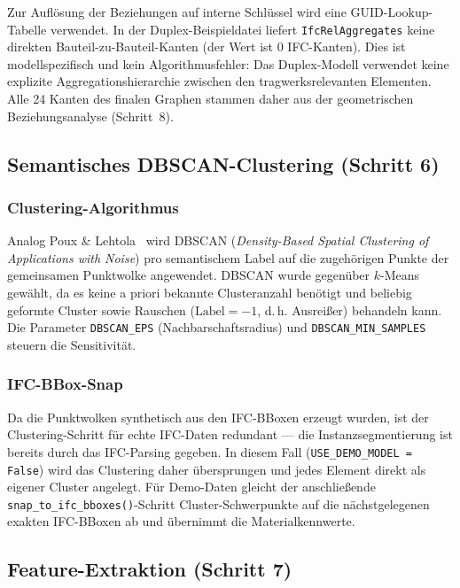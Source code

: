 \documentclass[a4paper,11pt]{article}
\begin{document}
Zur Auflösung der Beziehungen auf interne Schlüssel wird eine GUID-Lookup-Tabelle verwendet. In der Duplex-Beispieldatei liefert \texttt{IfcRelAggregates} keine direkten Bauteil-zu-Bauteil-Kanten (der Wert ist 0 IFC-Kanten). Dies ist modellspezifisch und kein Algorithmusfehler: Das Duplex-Modell verwendet keine explizite Aggregationshierarchie zwischen den tragwerksrelevanten Elementen. Alle 24 Kanten des finalen Graphen stammen daher aus der geometrischen Beziehungsanalyse (Schritt~8).

\subsection{Semantisches DBSCAN-Clustering (Schritt 6)}

\subsubsection{Clustering-Algorithmus}

Analog Poux \& Lehtola~\cite{poux2025scene} wird DBSCAN (\textit{Density-Based Spatial Clustering of Applications with Noise}) pro semantischem Label auf die zugehörigen Punkte der gemeinsamen Punktwolke angewendet. DBSCAN wurde gegenüber $k$-Means gewählt, da es keine a priori bekannte Clusteranzahl benötigt und beliebig geformte Cluster sowie Rauschen ($\text{Label} = -1$, d.\,h. Ausreißer) behandeln kann. Die Parameter \texttt{DBSCAN\_EPS} (Nachbarschaftsradius) und \texttt{DBSCAN\_MIN\_SAMPLES} steuern die Sensitivität.

\subsubsection{IFC-BBox-Snap}

Da die Punktwolken synthetisch aus den IFC-BBoxen erzeugt wurden, ist der Clustering-Schritt für echte IFC-Daten redundant — die Instanzsegmentierung ist bereits durch das IFC-Parsing gegeben. In diesem Fall (\texttt{USE\_DEMO\_MODEL = False}) wird das Clustering daher übersprungen und jedes Element direkt als eigener Cluster angelegt. Für Demo-Daten gleicht der anschließende \texttt{snap\_to\_ifc\_bboxes()}-Schritt Cluster-Schwerpunkte auf die nächstgelegenen exakten IFC-BBoxen ab und übernimmt die Materialkennwerte.

\subsection{Feature-Extraktion (Schritt 7)}
\end{document}
